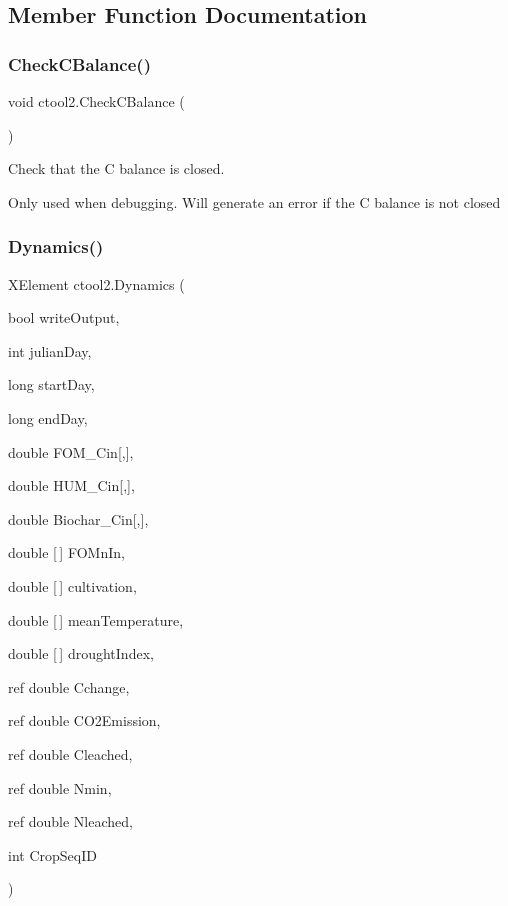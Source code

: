 \subsection{Member Function Documentation}
\mbox{\label{classctool2_ab9e6dc7d7c67b8956d4d5284c32c881b}} 
\subsubsection{\texorpdfstring{CheckCBalance()}{CheckCBalance()}}
{\footnotesize\ttfamily void ctool2.\+Check\+C\+Balance (\begin{DoxyParamCaption}{ }\end{DoxyParamCaption})\hspace{0.3cm}{\ttfamily [inline]}}



Check that the C balance is closed. 

Only used when debugging. Will generate an error if the C balance is not closed \mbox{\label{classctool2_a9443a20fe2c0134438a7e03c9821cee0}} 
\subsubsection{\texorpdfstring{Dynamics()}{Dynamics()}}
{\footnotesize\ttfamily X\+Element ctool2.\+Dynamics (\begin{DoxyParamCaption}\item[{bool}]{write\+Output,  }\item[{int}]{julian\+Day,  }\item[{long}]{start\+Day,  }\item[{long}]{end\+Day,  }\item[{double}]{F\+O\+M\+\_\+\+Cin\mbox{[},\mbox{]},  }\item[{double}]{H\+U\+M\+\_\+\+Cin\mbox{[},\mbox{]},  }\item[{double}]{Biochar\+\_\+\+Cin\mbox{[},\mbox{]},  }\item[{double \mbox{[}$\,$\mbox{]}}]{F\+O\+Mn\+In,  }\item[{double \mbox{[}$\,$\mbox{]}}]{cultivation,  }\item[{double \mbox{[}$\,$\mbox{]}}]{mean\+Temperature,  }\item[{double \mbox{[}$\,$\mbox{]}}]{drought\+Index,  }\item[{ref double}]{Cchange,  }\item[{ref double}]{C\+O2\+Emission,  }\item[{ref double}]{Cleached,  }\item[{ref double}]{Nmin,  }\item[{ref double}]{Nleached,  }\item[{int}]{Crop\+Seq\+ID }\end{DoxyParamCaption})\hspace{0.3cm}{\ttfamily [inline]}}



